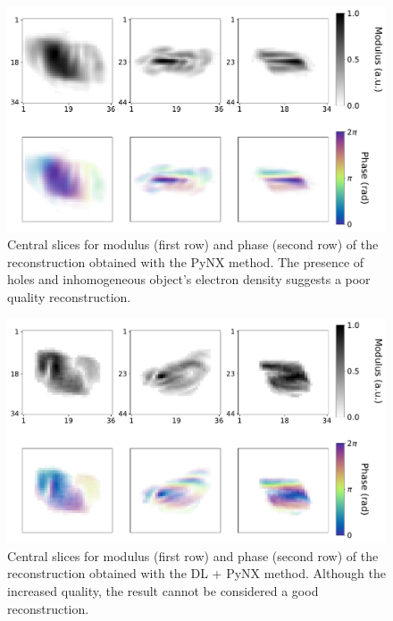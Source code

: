 \begin{figure}[H]
  \centering
  \includegraphics[width=\textwidth]{figures/AD/pynx_michael.pdf}
  \caption{Central slices for modulus (first row) and phase (second row) of the reconstruction obtained with the PyNX method.
           The presence of holes and inhomogeneous object's electron density suggests a poor quality reconstruction.}
  \label{fig:pynx_michael}
\end{figure}

\begin{figure}[H]
  \centering
  \includegraphics[width=\textwidth]{figures/AD/dl_pynx_michael.pdf}
  \caption{Central slices for modulus (first row) and phase (second row) of the reconstruction obtained with the DL + PyNX 
  method. Although the increased quality, the result cannot be considered a good reconstruction.}
  \label{fig:dl_pynx_michael}
\end{figure}


